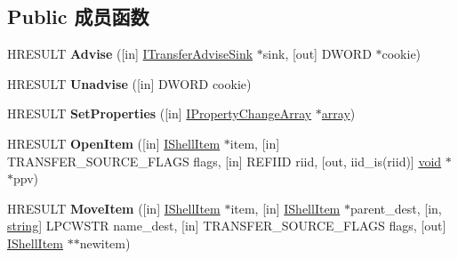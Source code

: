 \subsection*{Public 成员函数}
\begin{DoxyCompactItemize}
\item 
\mbox{\label{interface_i_transfer_source_a0799cd21bb1211dbb6df262a2914a2ab}} 
H\+R\+E\+S\+U\+LT {\bfseries Advise} (\mbox{[}in\mbox{]} \hyperlink{interface_i_transfer_advise_sink}{I\+Transfer\+Advise\+Sink} $\ast$sink, \mbox{[}out\mbox{]} D\+W\+O\+RD $\ast$cookie)
\item 
\mbox{\label{interface_i_transfer_source_a29d1e19e29877b8161f8a84ab09e57c4}} 
H\+R\+E\+S\+U\+LT {\bfseries Unadvise} (\mbox{[}in\mbox{]} D\+W\+O\+RD cookie)
\item 
\mbox{\label{interface_i_transfer_source_a417cd54d566b5a2bb52a587d61c510a2}} 
H\+R\+E\+S\+U\+LT {\bfseries Set\+Properties} (\mbox{[}in\mbox{]} \hyperlink{interface_i_property_change_array}{I\+Property\+Change\+Array} $\ast$\hyperlink{structarray}{array})
\item 
\mbox{\label{interface_i_transfer_source_a687e5a547ca32d1cdbed0d3f29b408fc}} 
H\+R\+E\+S\+U\+LT {\bfseries Open\+Item} (\mbox{[}in\mbox{]} \hyperlink{interface_i_shell_item}{I\+Shell\+Item} $\ast$item, \mbox{[}in\mbox{]} T\+R\+A\+N\+S\+F\+E\+R\+\_\+\+S\+O\+U\+R\+C\+E\+\_\+\+F\+L\+A\+GS flags, \mbox{[}in\mbox{]} R\+E\+F\+I\+ID riid, \mbox{[}out, iid\+\_\+is(riid)\mbox{]} \hyperlink{interfacevoid}{void} $\ast$$\ast$ppv)
\item 
\mbox{\label{interface_i_transfer_source_af7207c232bc51820eebcecd16e937f7c}} 
H\+R\+E\+S\+U\+LT {\bfseries Move\+Item} (\mbox{[}in\mbox{]} \hyperlink{interface_i_shell_item}{I\+Shell\+Item} $\ast$item, \mbox{[}in\mbox{]} \hyperlink{interface_i_shell_item}{I\+Shell\+Item} $\ast$parent\+\_\+dest, \mbox{[}in, \hyperlink{structstring}{string}\mbox{]} L\+P\+C\+W\+S\+TR name\+\_\+dest, \mbox{[}in\mbox{]} T\+R\+A\+N\+S\+F\+E\+R\+\_\+\+S\+O\+U\+R\+C\+E\+\_\+\+F\+L\+A\+GS flags, \mbox{[}out\mbox{]} \hyperlink{interface_i_shell_item}{I\+Shell\+Item} $\ast$$\ast$newitem)
\item 
\mbox{\label{interface_i_transfer_source_af4b9ebdbd9892a34e4142603dc14cb4e}} 

\end{DoxyCompactItemize}
